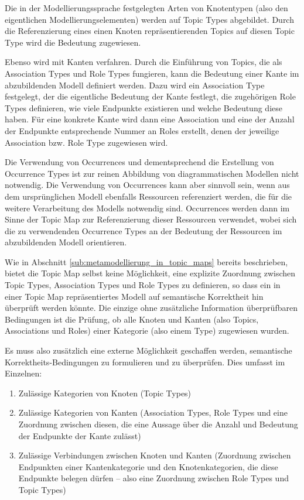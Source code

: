 Die in der Modellierungssprache festgelegten Arten von Knotentypen (also den eigentlichen Modellierungselementen) werden auf Topic Types abgebildet. Durch die Referenzierung eines einen Knoten repräsentierenden Topics auf diesen Topic Type wird die Bedeutung zugewiesen.

Ebenso wird mit Kanten verfahren. Durch die Einführung von Topics, die als Association Types und Role Types fungieren, kann die Bedeutung einer Kante im abzubildenden Modell definiert werden. Dazu wird ein Association Type festgelegt, der die eigentliche Bedeutung der Kante festlegt, die zugehörigen Role Types definieren, wie viele Endpunkte existieren und welche Bedeutung diese haben. Für eine konkrete Kante wird dann eine Association und eine der Anzahl der Endpunkte entsprechende Nummer an Roles erstellt, denen der jeweilige Association bzw. Role Type zugewiesen wird. 

Die Verwendung von Occurrences und dementsprechend die Erstellung von Occurrence Types ist zur reinen Abbildung von diagrammatischen Modellen nicht notwendig. Die Verwendung von Occurrences kann aber sinnvoll sein, wenn aus dem ursprünglichen Modell ebenfalls Ressourcen referenziert werden, die für die weitere Verarbeitung des Modells notwendig sind. Occurrences werden dann im Sinne der Topic Map zur Referenzierung dieser Ressourcen verwendet, wobei sich die zu verwendenden Occurrence Types an der Bedeutung der Ressourcen im abzubildenden Modell orientieren.

Wie in Abschnitt \ref{sub:metamodellierung_in_topic_maps} bereits beschrieben, bietet die Topic Map selbst keine Möglichkeit, eine explizite Zuordnung zwischen Topic Types, Association Types und Role Types zu definieren, so dass ein in einer Topic Map repräsentiertes Modell auf semantische Korrektheit hin überprüft werden könnte. Die einzige ohne zusätzliche Information überprüfbaren Bedingungen ist die Prüfung, ob alle Knoten und Kanten (also Topics, Associations und Roles) einer Kategorie (also einem Type) zugewiesen  wurden.

Es muss also zusätzlich eine externe Möglichkeit geschaffen werden, semantische Korrektheits-Bedingungen zu formulieren und zu überprüfen. Dies umfasst im Einzelnen:
\begin{enumerate}
 \item Zulässige Kategorien von Knoten (Topic Types)
 \item Zulässige Kategorien von Kanten (Association Types, Role Types und eine Zuordnung zwischen diesen, die eine Aussage über die Anzahl und Bedeutung der Endpunkte der Kante zulässt)
 \item Zulässige Verbindungen zwischen Knoten und Kanten (Zuordnung zwischen Endpunkten einer Kantenkategorie und den Knotenkategorien, die diese Endpunkte belegen dürfen -- also eine Zuordnung zwischen Role Types und Topic Types)
\end{enumerate}

